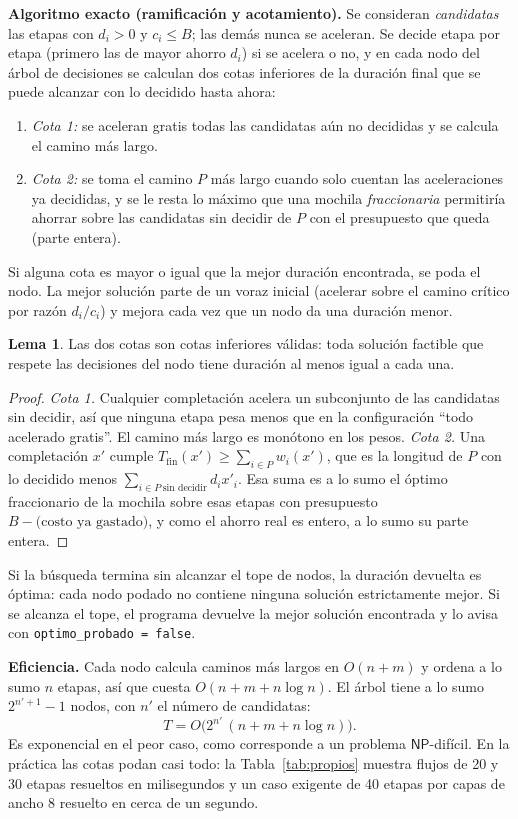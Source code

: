\documentclass[11pt,a4paper]{article}
\theoremstyle{definition}
\newtheorem{lema}[definicion]{Lema}
\newcommand{\Tfin}{T_{\mathrm{fin}}}
\newcommand{\NP}{\mathsf{NP}}
\begin{document}
\textbf{Algoritmo exacto (ramificación y acotamiento).} Se consideran \emph{candidatas} las etapas con $d_i>0$ y $c_i\le B$; las demás nunca se aceleran. Se decide etapa por etapa (primero las de mayor ahorro $d_i$) si se acelera o no, y en cada nodo del árbol de decisiones se calculan dos cotas inferiores de la duración final que se puede alcanzar con lo decidido hasta ahora:
\begin{enumerate}[nosep]
  \item \emph{Cota 1:} se aceleran gratis todas las candidatas aún no decididas y se calcula el camino más largo.
  \item \emph{Cota 2:} se toma el camino $P$ más largo cuando solo cuentan las aceleraciones ya decididas, y se le resta lo máximo que una mochila \emph{fraccionaria} permitiría ahorrar sobre las candidatas sin decidir de $P$ con el presupuesto que queda (parte entera).
\end{enumerate}
Si alguna cota es mayor o igual que la mejor duración encontrada, se poda el nodo. La mejor solución parte de un voraz inicial (acelerar sobre el camino crítico por razón $d_i/c_i$) y mejora cada vez que un nodo da una duración menor.

\begin{lema}
Las dos cotas son cotas inferiores válidas: toda solución factible que respete las decisiones del nodo tiene duración al menos igual a cada una.
\end{lema}
\begin{proof}
\emph{Cota 1.} Cualquier completación acelera un subconjunto de las candidatas sin decidir, así que ninguna etapa pesa menos que en la configuración ``todo acelerado gratis''. El camino más largo es monótono en los pesos. \emph{Cota 2.} Una completación $x'$ cumple $\Tfin(x')\ge\sum_{i\in P}w_i(x')$, que es la longitud de $P$ con lo decidido menos $\sum_{i\in P\ \text{sin decidir}}d_ix'_i$. Esa suma es a lo sumo el óptimo fraccionario de la mochila sobre esas etapas con presupuesto $B-\text{(costo ya gastado)}$, y como el ahorro real es entero, a lo sumo su parte entera.
\end{proof}

Si la búsqueda termina sin alcanzar el tope de nodos, la duración devuelta es óptima: cada nodo podado no contiene ninguna solución estrictamente mejor. Si se alcanza el tope, el programa devuelve la mejor solución encontrada y lo avisa con \texttt{optimo\_probado = false}.

\textbf{Eficiencia.} Cada nodo calcula caminos más largos en $O(n+m)$ y ordena a lo sumo $n$ etapas, así que cuesta $O(n+m+n\log n)$. El árbol tiene a lo sumo $2^{n'+1}-1$ nodos, con $n'$ el número de candidatas:
\[
T=O\bigl(2^{n'}\,(n+m+n\log n)\bigr).
\]
Es exponencial en el peor caso, como corresponde a un problema $\NP$-difícil. En la práctica las cotas podan casi todo: la Tabla~\ref{tab:propios} muestra flujos de 20 y 30 etapas resueltos en milisegundos y un caso exigente de 40 etapas por capas de ancho 8 resuelto en cerca de un segundo.
\end{document}
